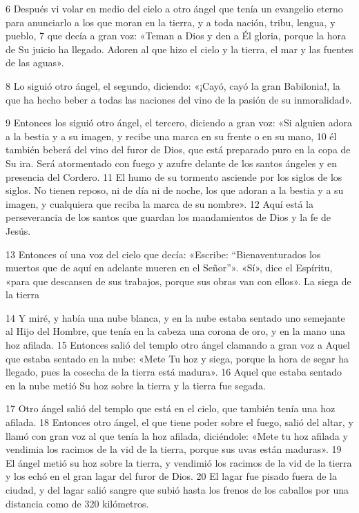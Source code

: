 \documentclass[12pt,twocolumn,twoside]{book}
\begin{document}
6 Después vi volar en medio del cielo a otro ángel que tenía un evangelio eterno para anunciarlo a los que moran en la tierra, y a toda nación, tribu, lengua, y pueblo, 7 que decía a gran voz: «Teman a Dios y den a Él gloria, porque la hora de Su juicio ha llegado. Adoren al que hizo el cielo y la tierra, el mar y las fuentes de las aguas».

8 Lo siguió otro ángel, el segundo, diciendo: «¡Cayó, cayó la gran Babilonia!, la que ha hecho beber a todas las naciones del vino de la pasión de su inmoralidad».

9 Entonces los siguió otro ángel, el tercero, diciendo a gran voz: «Si alguien adora a la bestia y a su imagen, y recibe una marca en su frente o en su mano, 10 él también beberá del vino del furor de Dios, que está preparado puro en la copa de Su ira. Será atormentado con fuego y azufre delante de los santos ángeles y en presencia del Cordero. 11 El humo de su tormento asciende por los siglos de los siglos. No tienen reposo, ni de día ni de noche, los que adoran a la bestia y a su imagen, y cualquiera que reciba la marca de su nombre». 12 Aquí está la perseverancia de los santos que guardan los mandamientos de Dios y la fe de Jesús.

13 Entonces oí una voz del cielo que decía: «Escribe: “Bienaventurados los muertos que de aquí en adelante mueren en el Señor”». «Sí», dice el Espíritu, «para que descansen de sus trabajos, porque sus obras van con ellos».
La siega de la tierra

14 Y miré, y había una nube blanca, y en la nube estaba sentado uno semejante al Hijo del Hombre, que tenía en la cabeza una corona de oro, y en la mano una hoz afilada. 15 Entonces salió del templo otro ángel clamando a gran voz a Aquel que estaba sentado en la nube: «Mete Tu hoz y siega, porque la hora de segar ha llegado, pues la cosecha de la tierra está madura». 16 Aquel que estaba sentado en la nube metió Su hoz sobre la tierra y la tierra fue segada.

17 Otro ángel salió del templo que está en el cielo, que también tenía una hoz afilada. 18 Entonces otro ángel, el que tiene poder sobre el fuego, salió del altar, y llamó con gran voz al que tenía la hoz afilada, diciéndole: «Mete tu hoz afilada y vendimia los racimos de la vid de la tierra, porque sus uvas están maduras». 19 El ángel metió su hoz sobre la tierra, y vendimió los racimos de la vid de la tierra y los echó en el gran lagar del furor de Dios. 20 El lagar fue pisado fuera de la ciudad, y del lagar salió sangre que subió hasta los frenos de los caballos por una distancia como de 320 kilómetros.
\end{document}

